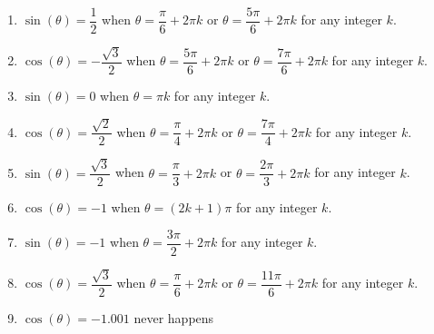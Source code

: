 \documentclass{ximera}
\begin{document}
\begin{enumerate}

\setcounter{enumi}{\value{HW}}

\item $\sin(\theta) = \dfrac{1}{2}$ when $\theta = \dfrac{\pi}{6} + 2\pi k$ or $\theta = \dfrac{5\pi}{6} + 2\pi k$ for any integer $k$.
\item $\cos(\theta) = -\dfrac{\sqrt{3}}{2}$ when $\theta = \dfrac{5\pi}{6} + 2\pi k$ or $\theta = \dfrac{7\pi}{6} + 2\pi k$ for any integer $k$.
\item $\sin(\theta) = 0$ when $\theta = \pi k$ for any integer $k$.
\item $\cos(\theta) = \dfrac{\sqrt{2}}{2}$ when $\theta = \dfrac{\pi}{4} + 2\pi k$ or $\theta = \dfrac{7\pi}{4} + 2\pi k$ for any integer $k$.
\item $\sin(\theta) = \dfrac{\sqrt{3}}{2}$ when $\theta = \dfrac{\pi}{3} + 2\pi k$ or $\theta = \dfrac{2\pi}{3} + 2\pi k$ for any integer $k$.
\item $\cos(\theta) = -1$ when $\theta = (2k + 1)\pi$ for any integer $k$.
\item  $\sin(\theta) = -1$ when $\theta = \dfrac{3\pi}{2} + 2\pi k$ for any integer $k$.
\item  $\cos(\theta) = \dfrac{\sqrt{3}}{2}$ when $\theta = \dfrac{\pi}{6} + 2\pi k$ or  $\theta = \dfrac{11\pi}{6} + 2\pi k$ for any integer $k$.
\item  $\cos(\theta) = -1.001$ never happens

\setcounter{HW}{\value{enumi}}

\end{enumerate}
\end{document}

